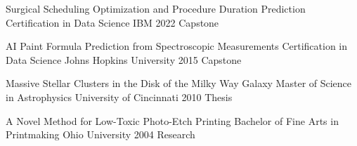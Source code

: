 \begin{cventries}
  \cveducationentry
    {Surgical Scheduling Optimization and Procedure Duration Prediction} %
    {Certification in Data Science} %
    {IBM} %
    {2022} %
    {Capstone} %

  \cveducationentry
    {AI Paint Formula Prediction from Spectroscopic Measurements} %
    {Certification in Data Science} %
    {Johns Hopkins University} %
    {2015} %
    {Capstone} %

  \cveducationentry
    {Massive Stellar Clusters in the Disk of the Milky Way Galaxy} %
    {Master of Science in Astrophysics} %
    {University of Cincinnati} %
    {2010} %
    {Thesis} %

  \cveducationentry
    {A Novel Method for Low-Toxic Photo-Etch Printing} %
    {Bachelor of Fine Arts in Printmaking} %
    {Ohio University} %
    {2004} %
    {Research} %
    
\end{cventries}